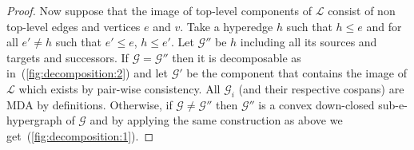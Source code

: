 \begin{proof}
    Now suppose that the image of top-level components of $\mathcal{L}$ consist of non top-level edges and vertices $e$ and $v$.
    Take a hyperedge $h$ such that $h \leq e$ and for all $e' \not = h$ such that $e' \leq e$, $h \leq e'$.
    Let $\mathcal{G}''$ be $h$ including all its sources and targets and successors.
    If $\mathcal{G} = \mathcal{G}''$ then it is decomposable as in~(\ref{fig:decomposition:2}) and let $\mathcal{G}'$ be the component that contains the image of $\mathcal{L}$ which exists by pair-wise consistency.
    All $\mathcal{G}_{i}$ (and their respective cospans) are MDA by definitions.
    Otherwise, if $\mathcal{G} \not = \mathcal{G}''$ then $\mathcal{G}''$ is a convex down-closed sub-e-hypergraph of $\mathcal{G}$ and 
    by applying the same construction as above we get~(\ref{fig:decomposition:1}).
\end{proof}


    

